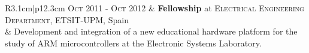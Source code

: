 \documentclass[a4paper,10pt]{article} %
\def \widthone {3.1cm}
\def \widthtwo {12.3cm}
\def \vspac {0.25cm}
\begin{document}
\begin{tabular}{R{\widthone}|p{\widthtwo}}
	\textsc{Oct} 2011 - \textsc{Oct} 2012 & \textbf{Fellowship} at \textsc{Electrical Engineering Department}, ETSIT-UPM, Spain\\
	& Development and integration of a new educational hardware platform for the study of ARM microcontrollers at the Electronic Systems Laboratory.%
	
	
\end{tabular}

\vspace{\vspac}
\end{document}
